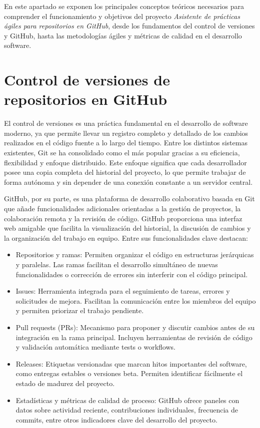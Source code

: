 
En este apartado se exponen los principales conceptos teóricos necesarios para comprender el funcionamiento y objetivos del proyecto \textit{Asistente de prácticas ágiles para repositorios en GitHub}, desde los fundamentos del control de versiones y GitHub, hasta las metodologías ágiles y métricas de calidad en el desarrollo software.

\section{Control de versiones de repositorios en GitHub}
El control de versiones es una práctica fundamental en el desarrollo de software moderno, ya que permite llevar un registro completo y detallado de los cambios realizados en el código fuente a lo largo del tiempo. Entre los distintos sistemas existentes, Git se ha consolidado como el más popular gracias a su eficiencia, flexibilidad y enfoque distribuido. Este enfoque significa que cada desarrollador posee una copia completa del historial del proyecto, lo que permite trabajar de forma autónoma y sin depender de una conexión constante a un servidor central.

GitHub, por su parte, es una plataforma de desarrollo colaborativo basada en Git que añade funcionalidades adicionales orientadas a la gestión de proyectos, la colaboración remota y la revisión de código. GitHub proporciona una interfaz web amigable que facilita la visualización del historial, la discusión de cambios y la organización del trabajo en equipo. Entre sus funcionalidades clave destacan:

\begin{itemize}
\item Repositorios y ramas: Permiten organizar el código en estructuras jerárquicas y paralelas. Las ramas facilitan el desarrollo simultáneo de nuevas funcionalidades o corrección de errores sin interferir con el código principal.
\item Issues: Herramienta integrada para el seguimiento de tareas, errores y solicitudes de mejora. Facilitan la comunicación entre los miembros del equipo y permiten priorizar el trabajo pendiente.
\item Pull requests (PRs): Mecanismo para proponer y discutir cambios antes de su integración en la rama principal. Incluyen herramientas de revisión de código y validación automática mediante tests o workflows.
\item Releases: Etiquetas versionadas que marcan hitos importantes del software, como entregas estables o versiones beta. Permiten identificar fácilmente el estado de madurez del proyecto.
\item Estadísticas y métricas de calidad de proceso: GitHub ofrece paneles con datos sobre actividad reciente, contribuciones individuales, frecuencia de commits, entre otros indicadores clave del desarrollo del proyecto.
\end{itemize}

